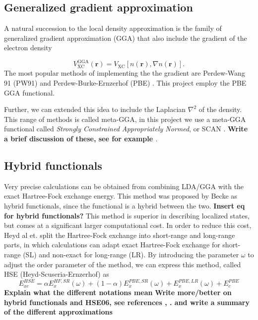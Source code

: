 \subsection{Generalized gradient approximation}
A natural succession to the local density approximation is the family of generalized gradient approximation (GGA) that also include the gradient of the electron density

\begin{equation}
V_\text{XC} ^\text{GGA} (\boldsymbol{r}) = V_\text{XC} [n(\boldsymbol{r}), \nabla n(\boldsymbol{r})].
\end{equation}
The most popular methods of implementing the  the gradient are Perdew-Wang 91 (PW91) \cite{pw91} and Perdew-Burke-Ernzerhof (PBE) \cite{pbe}. This project employ the PBE GGA functional.  

Further, we can extended this idea to include the Laplacian $\nabla^2$ of the density. This range of methods is called meta-GGA, in this project we use a meta-GGA functional called \textit{Strongly Constrained Appropriately Normed}, or SCAN \cite{scan}. \textbf{Write a brief discussion of these, see for example \cite{scan2}}.

\subsection{Hybrid functionals}
Very precise calculations can be obtained from combining LDA/GGA with the exact Hartree-Fock exchange energy. This method was proposed by Becke as hybrid functionals, since the functional is a hybrid between the two. \textbf{Insert eq for hybrid functionals?} This method is superior in describing localized states, but comes at a significant larger computational cost. In order to reduce this cost, Heyd al et. split the Hartree-Fock exchange into short-range and long-range parts, in which calculations can adapt exact Hartree-Fock exchange for short-range (SL) and non-exact for long-range (LR). By introducing the parameter $\omega$ to adjust the order parameter of the method, we can express this method, called HSE (Heyd-Scuseria-Ernzerhof) \cite{hse06} as
\begin{equation}
    E_{xc}^{HSE} = \alpha E_{x}^{HF,SR}(\omega) + (1-\alpha)E_{x}^{PBE, SR}(\omega) + E_x^{PBE,LR}(\omega) + E_{c}^{PBE}
\end{equation}
\textbf{Explain what the different notations mean}
\textbf{Write more/better on hybrid functionals and HSE06, see references \cite{hf_bandgap}, \cite{hf_comparision}. \cite{hse} and write a summary of the different approximations}

